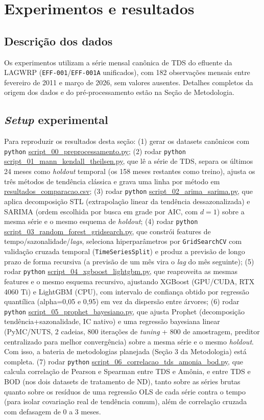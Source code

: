 \section{Experimentos e resultados}

\subsection{Descrição dos dados}

Os experimentos utilizam a série mensal canônica de TDS do efluente da LAGWRP (\texttt{EFF-001}/\texttt{EFF-001A} unificados), com 182 observações mensais entre fevereiro de 2011 e março de 2026, sem valores ausentes. Detalhes completos da origem dos dados e do pré-processamento estão na Seção de Metodologia.

\subsection{\textit{Setup} experimental}

Para reproduzir os resultados desta seção: (1) gerar os datasets canônicos com \texttt{python} \url{script_00_preprocessamento.py}; (2) rodar \texttt{python} \url{script_01_mann_kendall_theilsen.py}, que lê a série de TDS, separa os últimos 24 meses como \textit{holdout} temporal (os 158 meses restantes como treino), ajusta os três métodos de tendência clássica e grava uma linha por método em \url{resultados_comparacao.csv}; (3) rodar \texttt{python} \url{script_02_arima_sarima.py}, que aplica decomposição STL (extrapolação linear da tendência dessazonalizada) e SARIMA (ordem escolhida por busca em grade por AIC, com $d=1$) sobre a mesma série e o mesmo esquema de \textit{holdout}; (4) rodar \texttt{python} \url{script_03_random_forest_gridsearch.py}, que constrói features de tempo/sazonalidade/\textit{lags}, seleciona hiperparâmetros por \texttt{GridSearchCV} com validação cruzada temporal (\texttt{TimeSeriesSplit}) e produz a previsão de longo prazo de forma recursiva (a previsão de um mês vira o \textit{lag} do mês seguinte); (5) rodar \texttt{python} \url{script_04_xgboost_lightgbm.py}, que reaproveita as mesmas features e o mesmo esquema recursivo, ajustando XGBoost (GPU/CUDA, RTX 4060 Ti) e LightGBM (CPU), com intervalo de confiança obtido por regressão quantílica (alpha=0,05 e 0,95) em vez da dispersão entre árvores; (6) rodar \texttt{python} \url{script_05_prophet_bayesiano.py}, que ajusta Prophet (decomposição tendência+sazonalidade, IC nativo) e uma regressão bayesiana linear (PyMC/NUTS, 2 cadeias, 800 iterações de \textit{tuning} + 800 de amostragem, preditor centralizado para melhor convergência) sobre a mesma série e o mesmo \textit{holdout}. Com isso, a bateria de metodologias planejada (Seção 3 da Metodologia) está completa. (7) rodar \texttt{python} \url{script_06_correlacao_tds_amonia_bod.py}, que calcula correlação de Pearson e Spearman entre TDS e Amônia, e entre TDS e BOD (nos dois datasets de tratamento de ND), tanto sobre as séries brutas quanto sobre os resíduos de uma regressão OLS de cada série contra o tempo (para isolar covariação real de tendência comum), além de correlação cruzada com defasagem de 0 a 3 meses.

